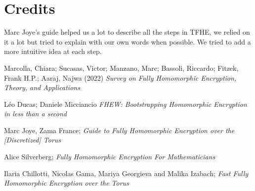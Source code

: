 \documentclass{article}
\theoremstyle{definition}
\theoremstyle{Theorem}
\begin{document}
\newpage

\section{Credits}

Marc Joye's guide \cite{joye_guide} helped us a lot to describe all the steps in TFHE, we relied on it a lot but tried to explain with our own words when possible. We tried to add a more intuitive idea at each step.



\begin{thebibliography}{9}

Marcolla, Chiara; Sucasas, Victor; Manzano, Marc; Bassoli, Riccardo; Fitzek, Frank H.P.; Aaraj, Najwa (2022) \emph{Survey on Fully Homomorphic Encryption, Theory, and Applications}

Léo Ducas; Daniele Micciancio \emph{FHEW: Bootstrapping Homomorphic Encryption in less than a second}

Marc Joye, Zama France; \emph{Guide to Fully Homomorphic Encryption over the [Discretized] Torus}

Alice Silverberg; \emph{Fully Homomorphic Encryption For Mathematicians}

Ilaria Chillotti, Nicolas Gama, Mariya Georgieva and Malika Izabach; \emph{Fast Fully Homomorphic Encryption over the Torus}

\end{thebibliography}
\end{document}
